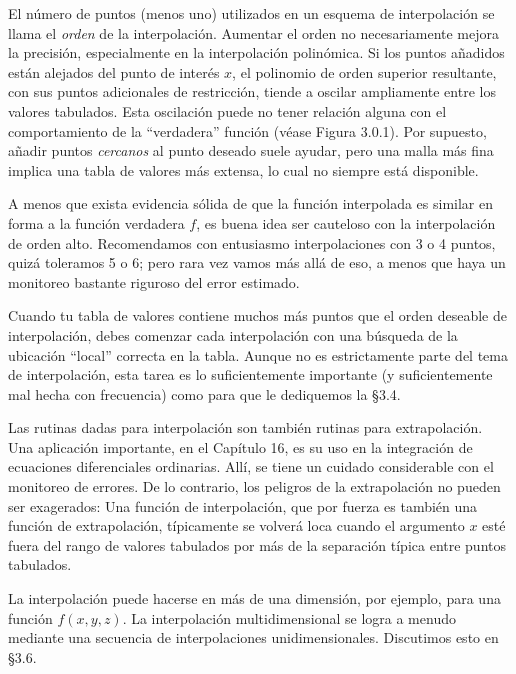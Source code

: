 \documentclass[10pt,a4paper]{book}
\begin{document}
\medskip

El número de puntos (menos uno) utilizados en un esquema de interpolación se llama el \textit{orden} de la interpolación. Aumentar el orden no necesariamente mejora la precisión, especialmente en la interpolación polinómica. Si los puntos añadidos están alejados del punto de interés \( x \), el polinomio de orden superior resultante, con sus puntos adicionales de restricción, tiende a oscilar ampliamente entre los valores tabulados. Esta oscilación puede no tener relación alguna con el comportamiento de la “verdadera” función (véase Figura 3.0.1). Por supuesto, añadir puntos \textit{cercanos} al punto deseado suele ayudar, pero una malla más fina implica una tabla de valores más extensa, lo cual no siempre está disponible.

\medskip

A menos que exista evidencia sólida de que la función interpolada es similar en forma a la función verdadera \( f \), es buena idea ser cauteloso con la interpolación de orden alto. Recomendamos con entusiasmo interpolaciones con 3 o 4 puntos, quizá toleramos 5 o 6; pero rara vez vamos más allá de eso, a menos que haya un monitoreo bastante riguroso del error estimado.

\medskip

Cuando tu tabla de valores contiene muchos más puntos que el orden deseable de interpolación, debes comenzar cada interpolación con una búsqueda de la ubicación “local” correcta en la tabla. Aunque no es estrictamente parte del tema de interpolación, esta tarea es lo suficientemente importante (y suficientemente mal hecha con frecuencia) como para que le dediquemos la \S3.4.

Las rutinas dadas para interpolación son también rutinas para extrapolación. Una aplicación importante, en el Capítulo 16, es su uso en la integración de ecuaciones diferenciales ordinarias. Allí, se tiene un cuidado considerable con el monitoreo de errores. De lo contrario, los peligros de la extrapolación no pueden ser exagerados: Una función de interpolación, que por fuerza es también una función de extrapolación, típicamente se volverá loca cuando el argumento $x$ esté fuera del rango de valores tabulados por más de la separación típica entre puntos tabulados.

La interpolación puede hacerse en más de una dimensión, por ejemplo, para una función $f(x, y, z)$. La interpolación multidimensional se logra a menudo mediante una secuencia de interpolaciones unidimensionales. Discutimos esto en §3.6.
\end{document}
